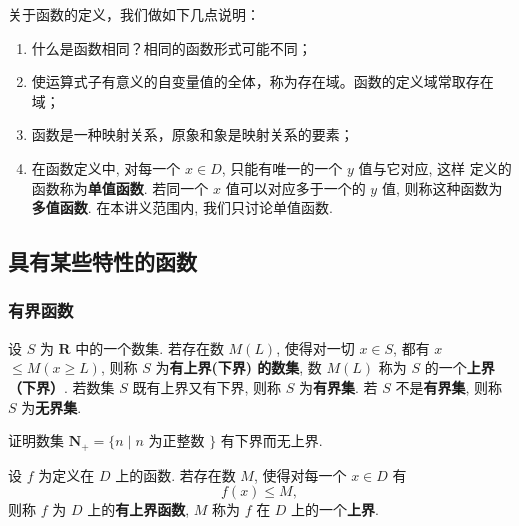 \documentclass[lang=cn,newtx,10pt,scheme=chinese]{elegantbook}
\begin{document}


关于函数的定义，我们做如下几点说明：

\begin{enumerate}
    \item 什么是函数相同？相同的函数形式可能不同；
    \item 使运算式子有意义的自变量值的全体，称为存在域。函数的定义域常取存在域；
    \item 函数是一种映射关系，原象和象是映射关系的要素；
    \item 在函数定义中, 对每一个 $x \in D$, 只能有唯一的一个 $y$ 值与它对应, 这样 定义的函数称为\textcolor{third}{\bf 单值函数}. 若同一个 $x$ 值可以对应多于一个的 $y$ 值, 则称这种函数为\textcolor{third}{\bf 多值函数}. 在本讲义范围内, 我们只讨论单值函数.
\end{enumerate}

\subsection{具有某些特性的函数}

\subsubsection{有界函数}

\begin{definition}[有界集]
    设 $S$ 为 $\mathbf{R}$ 中的一个数集. 若存在数 $M(L)$, 使得对一切 $x \in S$, 都有 $x$ $\leqslant M(x \geqslant L)$, 则称 $S$ 为\textcolor{third}{\bf 有上界(下界) 的数集}, 数 $M(L)$ 称为 $S$ 的一个\textcolor{third}{\bf 上界（下界）}.
    若数集 $S$ 既有上界又有下界, 则称 $S$ 为\textcolor{third}{\bf 有界集}. 若 $S$ 不是\textcolor{third}{\bf 有界集}, 则称 $S$ 为\textcolor{third}{\bf 无界集}.
\end{definition}

\begin{exercise}
    证明数集 $\mathbf{N}_{+}=\{n \mid n$ 为正整数 $\}$ 有下界而无上界.
\end{exercise}

\begin{definition}[有上界函数]
    设 $f$ 为定义在 $D$ 上的函数. 若存在数 $M$, 使得对每一个 $x \in D$ 有
    $$
    f(x) \leqslant M,
    $$
    则称 $f$ 为 $D$ 上的\textcolor{third}{\bf 有上界函数}, $M$ 称为 $f$ 在 $D$ 上的一个\textcolor{third}{\bf 上界}.
\end{definition}
\end{document}
